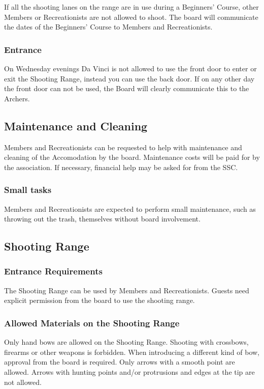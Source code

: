 \documentclass[a4paper]{article}
\begin{document}
\bigskip

If all the shooting lanes on the range are in use during a Beginners’ Course, other Members or Recreationists are not allowed to shoot. The board will communicate the dates of the Beginners’ Course to Members and Recreationists.

\subsubsection{Entrance}
On Wednesday evenings Da Vinci is not allowed to use the front door to enter or exit the Shooting Range, instead you can use the back door. If on any other day the front door can not be used, the Board will clearly communicate this to the Archers. 

\subsection{Maintenance and Cleaning}
Members and Recreationists can be requested to help with maintenance and cleaning of the Accomodation by the board. Maintenance costs will be paid for by the association. If necessary, financial help may be asked for from the SSC.

\subsubsection{Small tasks}
Members and Recreationists are expected to perform small maintenance, such as throwing out the trash, themselves without board involvement.

\subsection{Shooting Range}
\subsubsection{Entrance Requirements}
The Shooting Range can be used by Members and Recreationists. Guests need explicit permission from the board to use the shooting range. 

\subsubsection{Allowed Materials on the Shooting Range}
Only hand bows are allowed on the Shooting Range. Shooting with crossbows, firearms or other weapons is forbidden. When introducing a different kind of bow, approval from the board is required. Only arrows with a smooth point are allowed. Arrows with hunting points and/or protrusions and edges at the tip are not allowed.
\end{document}
